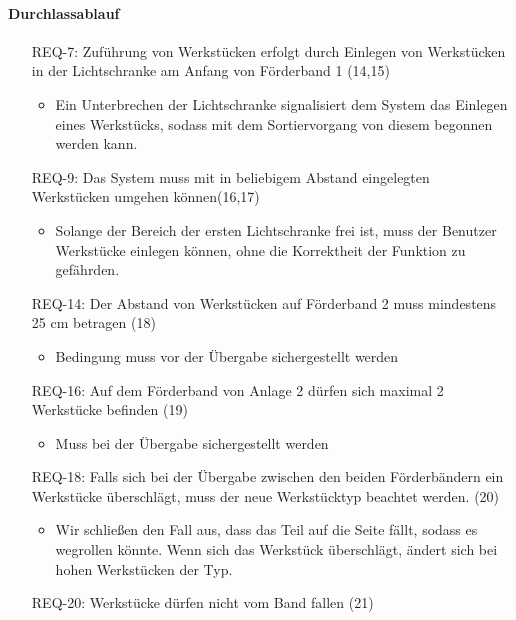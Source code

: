\paragraph{Durchlassablauf}
\begin{itemize}
    \item[REQ-7:] Zuführung von Werkstücken erfolgt durch Einlegen von Werkstücken in der
    Lichtschranke am Anfang von Förderband 1 (14,15)
    \begin{itemize}
        \item Ein Unterbrechen der Lichtschranke signalisiert dem System das Einlegen eines Werkstücks,
        sodass mit dem Sortiervorgang von diesem begonnen werden kann.
    \end{itemize}
    \item[REQ-9:] Das System muss mit in beliebigem Abstand eingelegten Werkstücken umgehen können(16,17)
    \begin{itemize}
        \item Solange der Bereich der ersten Lichtschranke frei ist, muss der Benutzer Werkstücke
        einlegen können, ohne die Korrektheit der Funktion zu gefährden.
    \end{itemize}
    \item[REQ-14:] Der Abstand von Werkstücken auf Förderband 2 muss mindestens 25 cm betragen (18)
    \begin{itemize}
        \item Bedingung muss vor der Übergabe sichergestellt werden
    \end{itemize}
    \item[REQ-16:] Auf dem Förderband von Anlage 2 dürfen sich maximal 2 Werkstücke befinden (19)
    \begin{itemize}
        \item Muss bei der Übergabe sichergestellt werden
    \end{itemize}
    \item[REQ-18:] Falls sich bei der Übergabe zwischen den beiden Förderbändern ein Werkstücke
    überschlägt, muss der neue Werkstücktyp beachtet werden. (20)
    \begin{itemize}
        \item Wir schließen den Fall aus, dass das Teil auf die Seite fällt, sodass es wegrollen könnte.
        Wenn sich das Werkstück überschlägt, ändert sich bei hohen Werkstücken der Typ.
    \end{itemize}
    \item[REQ-20:] Werkstücke dürfen nicht vom Band fallen (21)

\end{itemize}
